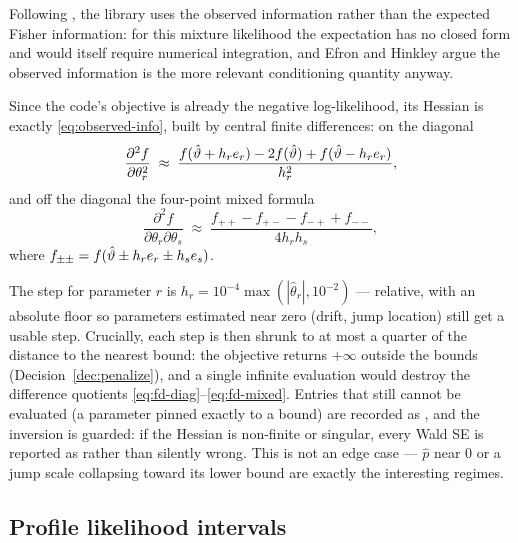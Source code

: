 \begin{decision}
Following \citet{EfronHinkley1978}, the library uses the observed
information rather than the expected Fisher information: for this mixture
likelihood the expectation has no closed form and would itself require
numerical integration, and Efron and Hinkley argue the observed
information is the more relevant conditioning quantity anyway.
\end{decision}

Since the code's objective is already the negative log-likelihood, its
Hessian is exactly \eqref{eq:observed-info}, built by central finite
differences: on the diagonal
\begin{equation}
  \frac{\partial^2 f}{\partial \theta_r^2}
  \;\approx\;
  \frac{f(\hat{\vartheta} + h_r e_r) - 2 f(\hat{\vartheta})
        + f(\hat{\vartheta} - h_r e_r)}{h_r^2},
  \label{eq:fd-diag}
\end{equation}
and off the diagonal the four-point mixed formula
\begin{equation}
  \frac{\partial^2 f}{\partial \theta_r \partial \theta_s}
  \;\approx\;
  \frac{f_{++} - f_{+-} - f_{-+} + f_{--}}{4 h_r h_s},
  \label{eq:fd-mixed}
\end{equation}
where $f_{\pm\pm} = f(\hat{\vartheta} \pm h_r e_r \pm h_s e_s)$.

\begin{decision}
\label{dec:fd-steps}
The step for parameter $r$ is $h_r = 10^{-4} \max(|\hat\theta_r|, 10^{-2})$
--- relative, with an absolute floor so parameters estimated near zero
(drift, jump location) still get a usable step. Crucially, each step is
then shrunk to at most a quarter of the distance to the nearest bound:
the objective returns $+\infty$ outside the bounds
(Decision~\ref{dec:penalize}), and a single infinite evaluation would
destroy the difference quotients \eqref{eq:fd-diag}--\eqref{eq:fd-mixed}.
Entries that still cannot be evaluated (a parameter pinned exactly to a
bound) are recorded as , and the inversion is guarded: if the
Hessian is non-finite or singular, every Wald SE is reported as
 rather than silently wrong. This is not an edge case ---
$\hat p$ near $0$ or a jump scale collapsing toward its lower bound are
exactly the interesting regimes.
\end{decision}

\subsection{Profile likelihood intervals}
\label{sec:profile}

